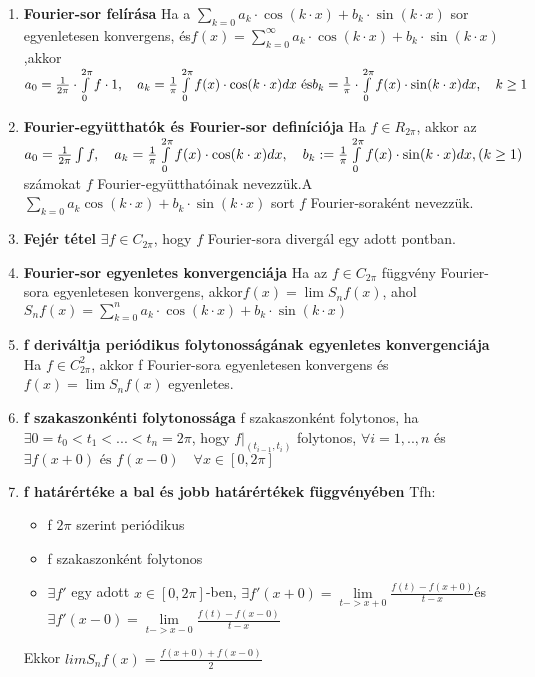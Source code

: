 \documentclass{article}
\begin{document}
\begin{enumerate}
	\item\textbf{Fourier-sor felírása}\br
	Ha a $\sum\limits_{k=0} a_k\cdot\cos(k\cdot x)+b_k\cdot\sin(k\cdot x)$ sor
	egyenletesen konvergens, és\br$f(x)=\sum\limits_{k=0}^\infty
	a_k\cdot\cos(k\cdot x)+b_k\cdot\sin(k\cdot x)$,\br akkor
	$a_0=\frac{1}{2\pi}\cdot\int\limits_0^{2\pi}f\cdot1,\quad
	a_k=\frac{1}{\pi}\int\limits_0^{2\pi}
	f(x)\cdot\cos(k\cdot x)dx\text{ és}\br b_k=\frac{1}{\pi}\cdot\int\limits_0^{2\pi}
	f(x)\cdot\sin(k\cdot x)dx,\quad k\geq1$
	
	\item\textbf{Fourier-együtthatók és Fourier-sor definíciója}\br
	Ha $f\in R_{2\pi}$, akkor az $a_0=\frac{1}{2\pi}\int f,\quad a_k=
	\frac{1}{\pi}\int\limits_0^{2\pi}f(x)\cdot\cos(k\cdot x)dx,\quad b_k:=
	\frac{1}{\pi}\int\limits_0^{2\pi}f(x)\cdot\sin(k\cdot x)dx,\br(k\geq1)$
	számokat $f$ Fourier-együtthatóinak nevezzük.\br A $\sum\limits_{k=0}a_k
	\cos(k\cdot x)+b_k\cdot\sin(k\cdot x)$ sort $f$ Fourier-soraként nevezzük.
	
	\item\textbf{Fejér tétel}\br
	$\exists f\in C_{2\pi}$, hogy $f$ Fourier-sora divergál egy adott pontban.
	
	\item\textbf{Fourier-sor egyenletes konvergenciája}\br
	Ha az $f\in C_{2\pi}$ függvény Fourier-sora egyenletesen konvergens, akkor\br$f(x)=\lim S_n
	f(x)$, ahol $S_n f(x)=\sum\limits_{k=0}^{n}a_k\cdot\cos(k\cdot x)+b_k\cdot\sin(k\cdot x)$
	
	\item\textbf{f deriváltja periódikus folytonosságának egyenletes konvergenciája}\br
	Ha $f\in C_{2\pi}^2$, akkor f Fourier-sora egyenletesen konvergens és $f(x)=\lim S_nf(x)$ egyenletes.
	
	\item\textbf{f szakaszonkénti folytonossága}\br
	f szakaszonként folytonos, ha $\exists 0=t_0<t_1<...<t_n=2\pi$, hogy
	$f|_{(t_{i-1}, t_i)}$ folytonos, $\forall i=1,..,n$ és $\exists f(x+0)\text{ és }f(x-0)
	\quad\forall x\in[0,2\pi]$
	
	\item\textbf{f határértéke a bal és jobb határértékek függvényében}\br
	Tfh: \begin{itemize}
		\item f $2\pi$ szerint periódikus
		\item f szakaszonként folytonos
		\item $\exists f'$ egy adott $x\in[0,2\pi]$-ben, $\exists f'(x+0)=\lim\limits_{t->x+0}
		\frac{f(t)-f(x+0)}{t-x}$\br és $\exists f'(x-0)=\lim\limits_{t->x-0}
		\frac{f(t)-f(x-0)}{t-x}$
	\end{itemize}
	Ekkor $lim S_n f(x)=\frac{f(x+0) + f(x-0)}{2}$
	

\end{enumerate}
\end{document}
